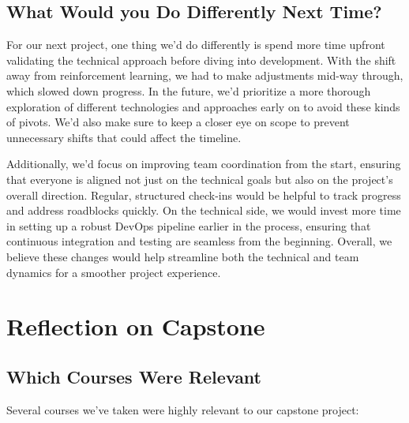 \documentclass{article}
\begin{document}
\subsection{What Would you Do Differently Next Time?}


For our next project, one thing we’d do differently is spend more time upfront 
validating the technical approach before diving into development. With the shift 
away from reinforcement learning, we had to make adjustments mid-way through, which 
slowed down progress. In the future, we’d prioritize a more thorough exploration of 
different technologies and approaches early on to avoid these kinds of pivots. We’d 
also make sure to keep a closer eye on scope to prevent unnecessary shifts that could 
affect the timeline.

Additionally, we’d focus on improving team coordination from the start, ensuring that 
everyone is aligned not just on the technical goals but also on the project’s overall 
direction. Regular, structured check-ins would be helpful to track progress and address 
roadblocks quickly. On the technical side, we would invest more time in setting up a robust
DevOps pipeline earlier in the process, ensuring that continuous integration and testing are 
seamless from the beginning. Overall, we believe these changes would help streamline both the 
technical and team dynamics for a smoother project experience.

\section{Reflection on Capstone}


\subsection{Which Courses Were Relevant}

Several courses we’ve taken were highly relevant to our capstone project:
\end{document}
